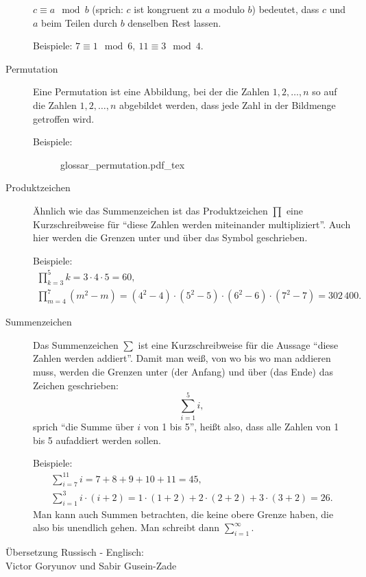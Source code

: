 \begin{description}
		$c\equiv a \mod b$ (sprich: $c$ ist kongruent zu $a$ modulo $b$) bedeutet, dass $c$ und $a$ beim Teilen durch $b$ denselben Rest lassen.

		Beispiele: $7\equiv 1 \mod 6,\ 11\equiv 3 \mod 4$.
	\item[Permutation] Eine Permutation ist eine Abbildung, bei der die Zahlen $1,2,\dotsc,n$ so auf die Zahlen $1,2,\dotsc,n$ abgebildet werden, dass jede Zahl in der Bildmenge getroffen wird.

		Beispiele:
		\begin{figure}
			\def\svgwidth{200pt}
			{glossar_permutation.pdf_tex}
		\end{figure}
	\item[Produktzeichen] Ähnlich wie das Summenzeichen ist das Produktzeichen $\prod$ eine Kurzschreibweise für \enquote{diese Zahlen werden miteinander multipliziert}. Auch hier werden die Grenzen unter und über das Symbol geschrieben.

		Beispiele:
		\begin{gather*}
			\prod\limits_{k=3}^5 k = 3\cdot 4\cdot 5 = 60,\\
			\prod\limits_{m=4}^7 (m^2 - m) = (4^2-4)\cdot(5^2-5)\cdot (6^2-6) \cdot (7^2-7)= 302\,400.
		\end{gather*}
	\item[Summenzeichen] Das Summenzeichen $\sum$ ist eine Kurzschreibweise für die Aussage \enquote{diese Zahlen werden addiert}.
		Damit man weiß, von wo bis wo man addieren muss, werden die Grenzen unter (der Anfang) und über (das Ende) das Zeichen geschrieben:
		\begin{equation*}
			\sum\limits_{i=1}^5 i,
		\end{equation*}
		sprich \enquote{die Summe über $i$ von 1 bis 5}, heißt also, dass alle Zahlen von 1 bis 5 aufaddiert werden sollen.

		Beispiele:
		\begin{gather*}
			\sum\limits_{i=7}^{11} i= 7+8+9+10+11 = 45,\\
			\sum\limits_{i=1}^3 i\cdot (i+2) = 1\cdot (1+2) + 2\cdot (2+2) + 3\cdot (3+2) = 26.
		\end{gather*}
		Man kann auch Summen betrachten, die keine obere Grenze haben, die also bis unendlich gehen. Man schreibt dann $\sum\limits_{i=1}^\infty$.
\end{description}
\clearpage
\null\vfill
\noindent
Übersetzung Russisch - Englisch:\\
\null\quad Victor Goryunov und Sabir Gusein-Zade\\
